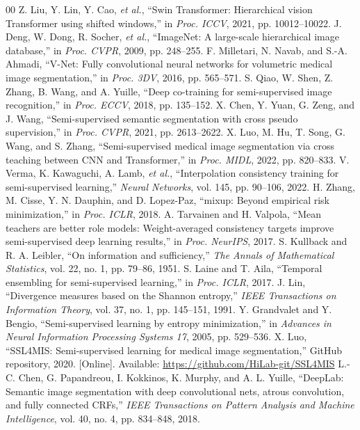 \documentclass{IEEEtran}
\begin{document}
\begin{thebibliography}{00}
 Z. Liu, Y. Lin, Y. Cao, \textit{et al.}, ``Swin Transformer: Hierarchical vision Transformer using shifted windows,'' in \textit{Proc. ICCV}, 2021, pp. 10012--10022.
 J. Deng, W. Dong, R. Socher, \textit{et al.}, ``ImageNet: A large-scale hierarchical image database,'' in \textit{Proc. CVPR}, 2009, pp. 248--255.
 F. Milletari, N. Navab, and S.-A. Ahmadi, ``V-Net: Fully convolutional neural networks for volumetric medical image segmentation,'' in \textit{Proc. 3DV}, 2016, pp. 565--571.
 S. Qiao, W. Shen, Z. Zhang, B. Wang, and A. Yuille, ``Deep co-training for semi-supervised image recognition,'' in \textit{Proc. ECCV}, 2018, pp. 135--152.
 X. Chen, Y. Yuan, G. Zeng, and J. Wang, ``Semi-supervised semantic segmentation with cross pseudo supervision,'' in \textit{Proc. CVPR}, 2021, pp. 2613--2622.
 X. Luo, M. Hu, T. Song, G. Wang, and S. Zhang, ``Semi-supervised medical image segmentation via cross teaching between CNN and Transformer,'' in \textit{Proc. MIDL}, 2022, pp. 820--833.
 V. Verma, K. Kawaguchi, A. Lamb, \textit{et al.}, ``Interpolation consistency training for semi-supervised learning,'' \textit{Neural Networks}, vol. 145, pp. 90--106, 2022.
 H. Zhang, M. Cisse, Y. N. Dauphin, and D. Lopez-Paz, ``mixup: Beyond empirical risk minimization,'' in \textit{Proc. ICLR}, 2018.
 A. Tarvainen and H. Valpola, ``Mean teachers are better role models: Weight-averaged consistency targets improve semi-supervised deep learning results,'' in \textit{Proc. NeurIPS}, 2017.
 S. Kullback and R. A. Leibler, ``On information and sufficiency,'' \textit{The Annals of Mathematical Statistics}, vol. 22, no. 1, pp. 79--86, 1951.
 S. Laine and T. Aila, ``Temporal ensembling for semi-supervised learning,'' in \textit{Proc. ICLR}, 2017.
 J. Lin, ``Divergence measures based on the Shannon entropy,'' \textit{IEEE Transactions on Information Theory}, vol. 37, no. 1, pp. 145--151, 1991.
 Y. Grandvalet and Y. Bengio, ``Semi-supervised learning by entropy minimization,'' in \textit{Advances in Neural Information Processing Systems 17}, 2005, pp. 529--536.
 X. Luo, ``SSL4MIS: Semi-supervised learning for medical image segmentation,'' GitHub repository, 2020. [Online]. Available: \url{https://github.com/HiLab-git/SSL4MIS}
 L.-C. Chen, G. Papandreou, I. Kokkinos, K. Murphy, and A. L. Yuille, ``DeepLab: Semantic image segmentation with deep convolutional nets, atrous convolution, and fully connected CRFs,'' \textit{IEEE Transactions on Pattern Analysis and Machine Intelligence}, vol. 40, no. 4, pp. 834--848, 2018.

\end{thebibliography}
\end{document}

